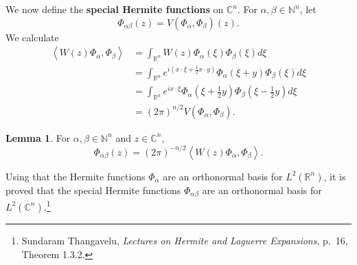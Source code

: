 \documentclass{article}
\newcommand{\inner}[2]{\left\langle #1, #2 \right\rangle}
\theoremstyle{definition}
\newtheorem{lemma}[theorem]{Lemma}
\theoremstyle{definition}
\begin{document}
We now define the \textbf{special Hermite functions} on $\mathbb{C}^n$. For $\alpha,\beta \in \mathbb{N}^n$, let
\[
\Phi_{\alpha \beta}(z) = V(\Phi_\alpha,\Phi_\beta)(z).
\]
We calculate
\begin{align*}
\inner{W(z)\Phi_\alpha}{\Phi_\beta}&=\int_{\mathbb{R}^n} W(z)\Phi_\alpha(\xi) \Phi_\beta(\xi) d\xi\\
&=\int_{\mathbb{R}^n} e^{i\left(x\cdot \xi+\frac{1}{2}x\cdot y\right)} \Phi_\alpha(\xi+y) \Phi_\beta(\xi) d\xi\\
&=\int_{\mathbb{R}^n} e^{ix\cdot \xi} \Phi_\alpha\left(\xi+\frac{1}{2}y\right) \Phi_\beta\left(\xi-\frac{1}{2}y\right) d\xi\\
&=(2\pi)^{n/2} V(\Phi_\alpha,\Phi_\beta).
\end{align*}

\begin{lemma}
For $\alpha,\beta \in \mathbb{N}^n$ and $z \in \mathbb{C}^n$,
\[
\Phi_{\alpha\beta}(z) = (2\pi)^{-n/2} \inner{W(z)\Phi_\alpha}{\Phi_\beta}.
\]
\end{lemma}

Using that the Hermite functions $\Phi_\alpha$ are an orthonormal basis for $L^2(\mathbb{R}^n)$, it is proved that the special Hermite functions
$\Phi_{\alpha\beta}$ are an orthonormal basis for $L^2(\mathbb{C}^n)$.\footnote{Sundaram Thangavelu, {\em Lectures on Hermite and Laguerre Expansions},
p.~16, Theorem 1.3.2.}
\end{document}
